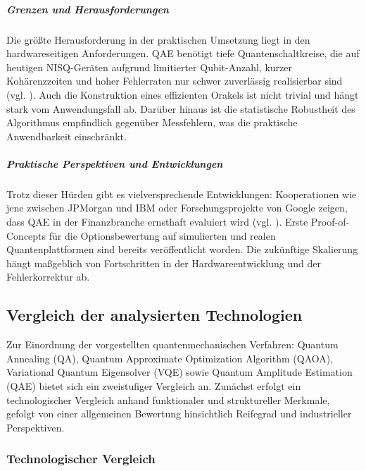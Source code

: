 \subparagraph{Grenzen und Herausforderungen}
Die größte Herausforderung in der praktischen Umsetzung liegt in den hardwareseitigen Anforderungen. QAE benötigt tiefe Quantenschaltkreise, die auf heutigen NISQ-Geräten aufgrund limitierter Qubit-Anzahl, kurzer Kohärenzzeiten und hoher Fehlerraten nur schwer zuverlässig realisierbar sind (vgl. \cite{bouland_prospects_2020, martin_new_2025}). Auch die Konstruktion eines effizienten Orakels ist nicht trivial und hängt stark vom Anwendungsfall ab. Darüber hinaus ist die statistische Robustheit des Algorithmus empfindlich gegenüber Messfehlern, was die praktische Anwendbarkeit einschränkt.

\subparagraph{Praktische Perspektiven und Entwicklungen}
Trotz dieser Hürden gibt es vielversprechende Entwicklungen: Kooperationen wie jene zwischen JPMorgan und IBM oder Forschungsprojekte von Google zeigen, dass QAE in der Finanzbranche ernsthaft evaluiert wird (vgl. \cite{egger_quantum_2020}). Erste Proof-of-Concepts für die Optionsbewertung auf simulierten und realen Quantenplattformen sind bereits veröffentlicht worden. Die zukünftige Skalierung hängt maßgeblich von Fortschritten in der Hardwareentwicklung und der Fehlerkorrektur ab.

\subsection{Vergleich der analysierten Technologien}

Zur Einordnung der vorgestellten quantenmechanischen Verfahren: Quantum Annealing (QA), Quantum Approximate Optimization Algorithm (QAOA), Variational Quantum Eigensolver (VQE) sowie Quantum Amplitude Estimation (QAE) bietet sich ein zweistufiger Vergleich an. Zunächst erfolgt ein technologischer Vergleich anhand funktionaler und struktureller Merkmale, gefolgt von einer allgemeinen Bewertung hinsichtlich Reifegrad und industrieller Perspektiven.

\subsubsection*{Technologischer Vergleich}

